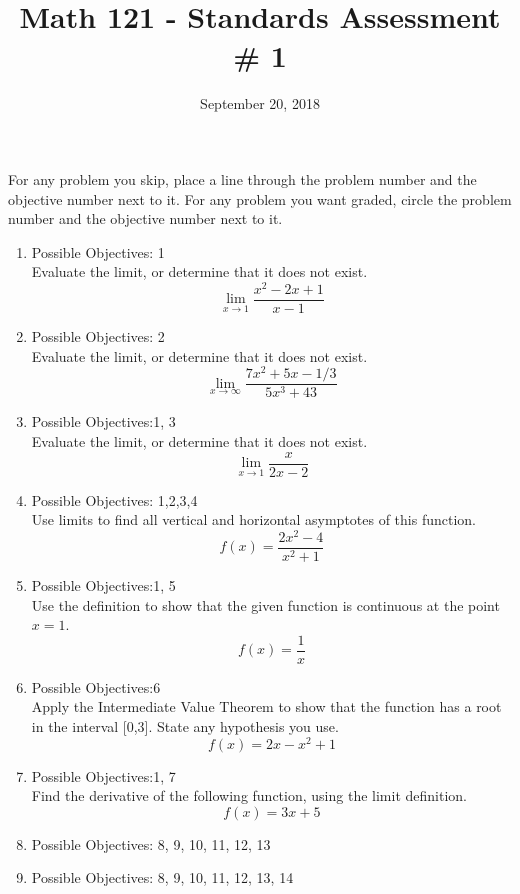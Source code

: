 \documentclass{exam}
\title{Math 121 - Standards Assessment \# 1}
\date{September 20, 2018}
\begin{document}
\maketitle
\bigskip

\begin{center}
\large
    For any problem you skip, place a line through the problem number and the objective number next to it. For any problem you want graded, circle the problem number and the objective number next to it.
\end{center}
\normalsize

\maketitle

\begin{enumerate}
\item Possible Objectives: 1\\
Evaluate the limit, or determine that it does not exist.
$$\lim_{x \rightarrow 1} \frac{x^2 - 2x+1}{x-1}$$
\item Possible Objectives: 2\\
Evaluate the limit, or determine that it does not exist.
$$\lim_{x\rightarrow \infty} \frac{7x^2 + 5x - 1/3}{5x^3 +43}$$
\item Possible Objectives:1, 3\\
Evaluate the limit, or determine that it does not exist.
$$\lim_{x \rightarrow 1}  \frac{x}{2x-2}$$
\item Possible Objectives: 1,2,3,4\\
Use limits to find all vertical and horizontal asymptotes of this function.
$$f(x) = \frac{2x^2 -4}{x^2 + 1}$$
\item Possible Objectives:1, 5\\
Use the definition to show that the given function is continuous at the point $x = 1$.
$$f(x) = \frac{1}{x}$$
\item Possible Objectives:6\\
Apply the Intermediate Value Theorem to show that the function has a root in the interval [0,3]. State any hypothesis you use.
$$f(x) = 2x - x^2 + 1$$
\item Possible Objectives:1, 7\\
Find the derivative of the following function, using the limit definition.
$$f(x) = 3x+5$$
\item Possible Objectives: 8, 9, 10, 11, 12, 13\\
\item Possible Objectives: 8, 9, 10, 11, 12, 13, 14\\
\end{enumerate}
\end{document}
